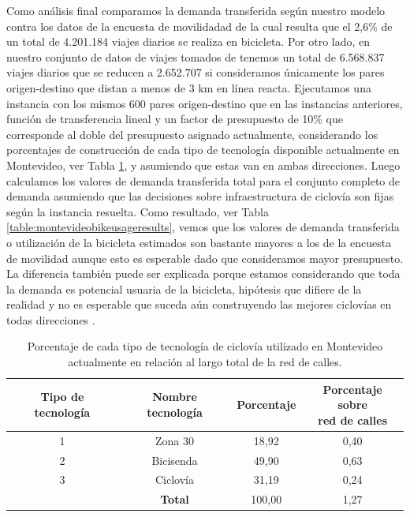 Como análisis final comparamos la demanda transferida según nuestro modelo contra los datos de la encuesta de movilidadad \cite{Mauttone2017a} de la cual resulta que el 2,6\% de un total de 4.201.184 viajes diarios se realiza en bicicleta. Por otro lado, en nuestro conjunto de datos de viajes tomados de \cite{Massobrio2020} tenemos un total de 6.568.837 viajes diarios que se reducen a 2.652.707 si consideramos únicamente los pares origen-destino que distan a menos de 3 km en línea reacta. Ejecutamos una instancia con los mismos 600 pares origen-destino que en las instancias anteriores, función de transferencia lineal y un factor de presupuesto de 10\% que corresponde al doble del presupuesto asignado actualmente, considerando los porcentajes de construcción de cada tipo de tecnología disponible actualmente en Montevideo, ver Tabla \ref{table:cicloviasmontevideo}, y asumiendo que estas van en ambas direcciones. Luego calculamos los valores de demanda transferida total para el conjunto completo de demanda asumiendo que las decisiones sobre infraestructura de ciclovía son fijas según la instancia resuelta. Como resultado, ver Tabla \ref{table:montevideobikeusageresults}, vemos que los valores de demanda transferida o utilización de la bicicleta estimados son bastante mayores a los de la encuesta de movilidad aunque esto es esperable dado que consideramos mayor presupuesto. La diferencia también puede ser explicada porque estamos considerando que toda la demanda es potencial usuaria de la bicicleta, hipótesis que difiere de la realidad y no es esperable que suceda aún construyendo las mejores ciclovías en todas direcciones \parencite{shwe2014}.

\begin{table}[h!]
  \centering
  \begin{tabular}{cccc}
    \toprule
      Tipo de tecnología & Nombre tecnología & Porcentaje & \shortstack{Porcentaje sobre \\ red de calles} \\
    \midrule
        1   & Zona 30    & 18,92  & 0,40   \\
        2   & Bicisenda  & 49,90  & 0,63   \\
        3   & Ciclovía   & 31,19  & 0,24   \\
    \midrule
            & \textbf{Total}  & 100,00 & 1,27   \\
    \bottomrule
  \end{tabular}
  \caption{Porcentaje de cada tipo de tecnología de ciclovía utilizado en Montevideo actualmente en relación al largo total de la red de calles.}
  \label{table:cicloviasmontevideo}
\end{table}

